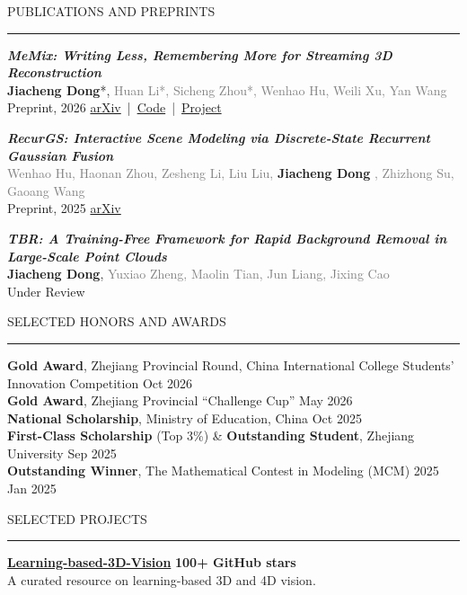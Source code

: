 \documentclass{resume} %
\renewenvironment{rSection}[1]{
\sectionskip
\textcolor{TsinghuaPurple}{\MakeUppercase{#1}}
\sectionlineskip
\hrule
\begin{list}{}{
\setlength{\leftmargin}{0em}
}
\item[]
}{
\end{list}
}
\begin{document}
\begin{rSection}{Publications and Preprints}

\vspace{0.1em}

\textbf{\textit{MeMix: Writing Less, Remembering More for Streaming 3D Reconstruction}}\\
{\small \textbf{Jiacheng Dong}*, \textcolor{gray}{Huan Li*, Sicheng Zhou*, Wenhao Hu, Weili Xu, Yan Wang}}\\
{\small Preprint, 2026 \quad \href{https://arxiv.org/abs/2603.15330}{arXiv} \,|\, \href{https://github.com/dongjiacheng06/MeMix}{Code} \,|\, \href{https://dongjiacheng06.github.io/MeMix/}{Project}}

\vspace{0.1em}

\textbf{\textit{RecurGS: Interactive Scene Modeling via Discrete-State Recurrent Gaussian Fusion}}\\
{\small
\textcolor{gray}{Wenhao Hu, Haonan Zhou, Zesheng Li, Liu Liu, }
\textbf{Jiacheng Dong}
\textcolor{gray}{, Zhizhong Su, Gaoang Wang}
}\\
{\small Preprint, 2025 \quad \href{https://arxiv.org/abs/2512.18386}{arXiv}}

\vspace{0.1em}

\textbf{\textit{TBR: A Training-Free Framework for Rapid Background Removal in Large-Scale Point Clouds}}\\
{\small\textbf{Jiacheng Dong}, \textcolor{gray}{Yuxiao Zheng, Maolin Tian, Jun Liang, Jixing Cao}}\\
{\small Under Review}

\end{rSection}


\begin{rSection}{Selected Honors and Awards} \itemsep -3pt  

\textbf{Gold Award}, Zhejiang Provincial Round, China International College Students' Innovation Competition \hfill Oct 2026\\
\textbf{Gold Award}, Zhejiang Provincial ``Challenge Cup'' \hfill May 2026\\
\textbf{National Scholarship}, Ministry of Education, China \hfill Oct 2025\\
\textbf{First-Class Scholarship} (Top 3\%) \& \textbf{Outstanding Student}, Zhejiang University \hfill Sep 2025\\
\textbf{Outstanding Winner}, The Mathematical Contest in Modeling (MCM) 2025 \hfill Jan 2025

\end{rSection}



\begin{rSection}{Selected Projects}
\textbf{\href{https://github.com/dongjiacheng06/Learning-based-3D-Vision}{Learning-based-3D-Vision}} \hfill {\small \textbf{100+ GitHub stars}}\\
{\small A curated resource on learning-based 3D and 4D vision.}

\end{rSection}
\end{document}
